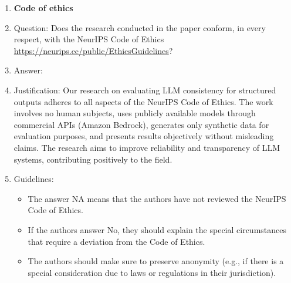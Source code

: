 \documentclass{article}
\begin{document}
\begin{enumerate}
\item {\bf Code of ethics}
    \item[] Question: Does the research conducted in the paper conform, in every respect, with the NeurIPS Code of Ethics \url{https://neurips.cc/public/EthicsGuidelines}?
    \item[] Answer: \answerNo{} %
    \item[] Justification: \justification Our research on evaluating LLM consistency for structured outputs adheres to all aspects of the NeurIPS Code of Ethics. The work involves no human subjects, uses publicly available models through commercial APIs (Amazon Bedrock), generates only synthetic data for evaluation purposes, and presents results objectively without misleading claims. The research aims to improve reliability and transparency of LLM systems, contributing positively to the field.{}
    \item[] Guidelines:
    \begin{itemize}
        \item The answer NA means that the authors have not reviewed the NeurIPS Code of Ethics.
        \item If the authors answer No, they should explain the special circumstances that require a deviation from the Code of Ethics.
        \item The authors should make sure to preserve anonymity (e.g., if there is a special consideration due to laws or regulations in their jurisdiction).
    \end{itemize}



\end{enumerate}
\end{document}
